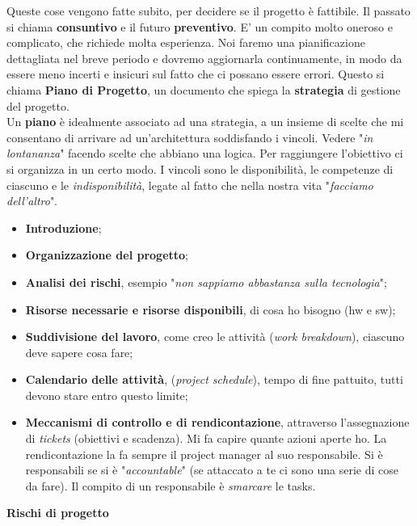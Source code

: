 Queste cose vengono fatte subito, per decidere se il progetto è fattibile. Il passato si chiama \textbf{consuntivo} e il futuro \textbf{preventivo}. E' un compito molto oneroso e complicato, che richiede molta esperienza. Noi faremo una pianificazione dettagliata nel breve periodo e dovremo aggiornarla continuamente, in modo da essere meno incerti e insicuri sul fatto che ci possano essere errori. Questo si chiama \textbf{Piano di Progetto}, un documento che spiega la \textbf{strategia} di gestione del progetto.\\
Un \textbf{piano} è idealmente associato ad una strategia, a un insieme di scelte che mi consentano di arrivare ad un'architettura soddisfando i vincoli. Vedere "\textit{in lontananza}" facendo scelte che abbiano una logica. Per raggiungere l'obiettivo ci si organizza in un certo modo. I vincoli sono le disponibilità, le competenze di ciascuno e le \textit{indisponibilità}, legate al fatto che nella nostra vita "\textit{facciamo dell'altro}".

\begin{itemize}

	\item \textbf{Introduzione};
	\item \textbf{Organizzazione del progetto};
	\item \textbf{Analisi dei rischi}, esempio "\textit{non sappiamo abbastanza sulla tecnologia}";
	\item \textbf{Risorse necessarie e risorse disponibili}, di cosa ho bisogno (hw e sw);
	\item \textbf{Suddivisione del lavoro}, come creo le attività (\textit{work breakdown}), ciascuno deve sapere cosa fare;
	\item \textbf{Calendario delle attività}, (\textit{project schedule}), tempo di fine pattuito, tutti devono stare entro questo limite;
	\item \textbf{Meccanismi di controllo e di rendicontazione}, attraverso l'assegnazione di \textit{tickets} (obiettivi e scadenza). Mi fa capire quante azioni aperte ho. La rendicontazione la fa sempre il project manager al suo responsabile. Si è responsabili se si è "\textit{accountable}" (se attaccato a te ci sono una serie di cose da fare). Il compito di un responsabile è \textit{smarcare} le tasks.

\end{itemize}

\textbf{Rischi di progetto}\\\\


